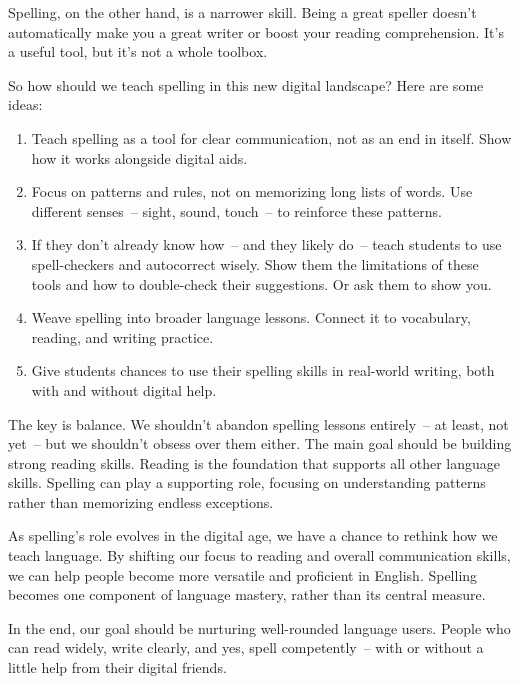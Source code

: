 Spelling, on the other hand, is a narrower skill. Being a great speller doesn't automatically make you a great writer or boost your reading comprehension. It's a useful tool, but it's not a whole toolbox.

So how should we teach spelling in this new digital landscape? Here are some ideas:

\begin{enumerate}[noitemsep]
    \item Teach spelling as a tool for clear communication, not as an end in itself. Show how it works alongside digital aids.

    \item Focus on patterns and rules, not on memorizing long lists of words. Use different senses~-- sight, sound, touch~-- to reinforce these patterns.

    \item If they don't already know how~-- and they likely do~-- teach students to use spell-checkers and autocorrect wisely. Show them the limitations of these tools and how to double-check their suggestions. Or ask them to show you.

    \item Weave spelling into broader language lessons. Connect it to vocabulary, reading, and writing practice.

    \item Give students chances to use their spelling skills in real-world writing, both with and without digital help.
\end{enumerate}

The key is balance. We shouldn't abandon spelling lessons entirely~-- at least, not yet~-- but we shouldn't obsess over them either. The main goal should be building strong reading skills. Reading is the foundation that supports all other language skills. Spelling can play a supporting role, focusing on understanding patterns rather than memorizing endless exceptions.

As spelling's role evolves in the digital age, we have a chance to rethink how we teach language. By shifting our focus to reading and overall communication skills, we can help people become more versatile and proficient in English. Spelling becomes one component of language mastery, rather than its central measure.

In the end, our goal should be nurturing well-rounded language users. People who can read widely, write clearly, and yes, spell competently~-- with or without a little help from their digital friends.

